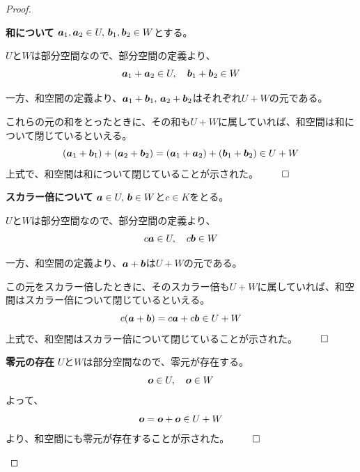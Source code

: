 \documentclass[../../../topic_linear-algebra]{subfiles}
\begin{document}
\begin{proof}
  \begin{subpattern}{\bfseries 和について}
    $\vb*{a}_1, \vb*{a}_2 \in U, \, \vb*{b}_1, \vb*{b}_2 \in W$とする。

    $U$と$W$は部分空間なので、部分空間の定義より、
    \begin{equation*}
      \vb*{a}_1 + \vb*{a}_2 \in U, \quad \vb*{b}_1 + \vb*{b}_2 \in W
    \end{equation*}

    一方、和空間の定義より、$\vb*{a}_1 + \vb*{b}_1,\, \vb*{a}_2 + \vb*{b}_2$はそれぞれ$U+W$の元である。

    これらの元の和をとったときに、その和も$U + W$に属していれば、和空間は和について閉じているといえる。
    \begin{equation*}
      (\vb*{a}_1 + \vb*{b}_1) + (\vb*{a}_2 + \vb*{b}_2) = (\vb*{a}_1 + \vb*{a}_2) + (\vb*{b}_1 + \vb*{b}_2)
                                                        \in U + W
    \end{equation*}
    上式で、和空間は和について閉じていることが示された。 $\qed$
  \end{subpattern}

  \begin{subpattern}{\bfseries スカラー倍について}
    $\vb*{a} \in U, \, \vb*{b} \in W$と$c \in K$をとる。

    $U$と$W$は部分空間なので、部分空間の定義より、
    \begin{equation*}
      c \vb*{a} \in U, \quad
      c \vb*{b} \in W
    \end{equation*}

    一方、和空間の定義より、$\vb*{a} + \vb*{b}$は$U + W$の元である。

    この元をスカラー倍したときに、そのスカラー倍も$U + W$に属していれば、和空間はスカラー倍について閉じているといえる。
    \begin{equation*}
      c(\vb*{a} + \vb*{b}) = c \vb*{a} + c \vb*{b}
                           \in U + W
    \end{equation*}
    上式で、和空間はスカラー倍について閉じていることが示された。 $\qed$
  \end{subpattern}
  
  \begin{subpattern}{\bfseries 零元の存在}
    $U$と$W$は部分空間なので、零元が存在する。
    \begin{equation*}
      \vb*{o} \in U, \quad \vb*{o} \in W
    \end{equation*}
    よって、
    \begin{equation*}
      \vb*{o} = \vb*{o} + \vb*{o} \in U + W
    \end{equation*}
    より、和空間にも零元が存在することが示された。 $\qed$
  \end{subpattern}
\end{proof}
\end{document}
